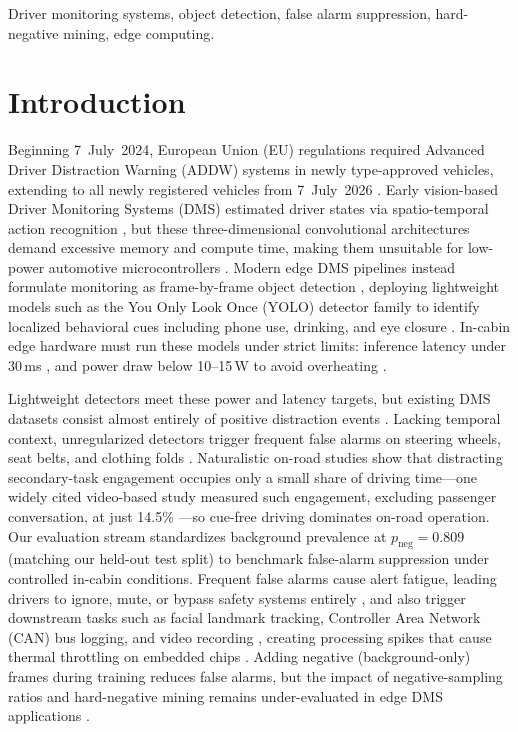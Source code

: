 \documentclass[conference]{IEEEtran}
\begin{document}
\begin{IEEEkeywords}
Driver monitoring systems, object detection, false alarm suppression, hard-negative mining, edge computing.
\end{IEEEkeywords}  

\section{Introduction}
Beginning 7~July~2024, European Union (EU) regulations required Advanced Driver Distraction Warning (ADDW) systems in newly type-approved vehicles, extending to all newly registered vehicles from 7~July~2026 \cite{ec2026safercars}. Early vision-based Driver Monitoring Systems (DMS) estimated driver states via spatio-temporal action recognition \cite{ortega2020dmd, canas2021detection}, but these three-dimensional convolutional architectures demand excessive memory and compute time, making them unsuitable for low-power automotive microcontrollers \cite{canas2021detection, florez2024real}. Modern edge DMS pipelines instead formulate monitoring as frame-by-frame object detection \cite{yolodrive2025, pyolov82024}, deploying lightweight models such as the You Only Look Once (YOLO) detector family to identify localized behavioral cues including phone use, drinking, and eye closure \cite{ortega2020dmd, yolov12dms2025}. In-cabin edge hardware must run these models under strict limits: inference latency under 30\,ms \cite{liu2019edge}, and power draw below 10--15\,W to avoid overheating \cite{florez2024real, benoitcattin2020thermal}.

Lightweight detectors meet these power and latency targets, but existing DMS datasets consist almost entirely of positive distraction events \cite{yolodrive2025, pyolov82024}. Lacking temporal context, unregularized detectors trigger frequent false alarms on steering wheels, seat belts, and clothing folds \cite{canas2021detection}. Naturalistic on-road studies show that distracting secondary-task engagement occupies only a small share of driving time---one widely cited video-based study measured such engagement, excluding passenger conversation, at just 14.5\% \cite{stutts2005}---so cue-free driving dominates on-road operation. Our evaluation stream standardizes background prevalence at $p_{\mathrm{neg}} = 0.809$ (matching our held-out test split) to benchmark false-alarm suppression under controlled in-cabin conditions. Frequent false alarms cause alert fatigue, leading drivers to ignore, mute, or bypass safety systems entirely \cite{lambert2026chinese, parasuraman1997humans}, and also trigger downstream tasks such as facial landmark tracking, Controller Area Network (CAN) bus logging, and video recording \cite{florez2024real, liu2019edge}, creating processing spikes that cause thermal throttling on embedded chips \cite{benoitcattin2020thermal}. Adding negative (background-only) frames during training reduces false alarms, but the impact of negative-sampling ratios and hard-negative mining remains under-evaluated in edge DMS applications \cite{ultralytics2023guidelines, jin2018video}.
\end{document}
